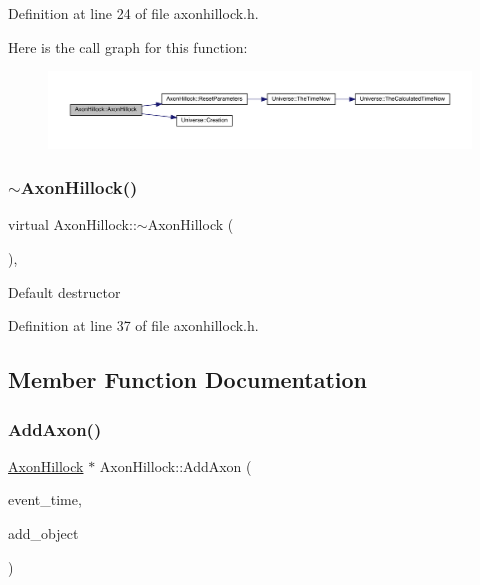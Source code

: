 Definition at line 24 of file axonhillock.\+h.

Here is the call graph for this function\+:\nopagebreak
\begin{figure}[H]
\begin{center}
\leavevmode
\includegraphics[width=350pt]{class_axon_hillock_a250945e24a51475369b6c7881c0d955b_cgraph}
\end{center}
\end{figure}
\mbox{\label{class_axon_hillock_ae86220026d7c87edc1c514521d66f992}} 
\subsubsection{\texorpdfstring{$\sim$\+Axon\+Hillock()}{~AxonHillock()}}
{\footnotesize\ttfamily virtual Axon\+Hillock\+::$\sim$\+Axon\+Hillock (\begin{DoxyParamCaption}{ }\end{DoxyParamCaption})\hspace{0.3cm}{\ttfamily [inline]}, {\ttfamily [virtual]}}

Default destructor 

Definition at line 37 of file axonhillock.\+h.



\subsection{Member Function Documentation}
\mbox{\label{class_axon_hillock_a02bfbaea9ea7a160933f8500c8b41d6a}} 
\subsubsection{\texorpdfstring{Add\+Axon()}{AddAxon()}}
{\footnotesize\ttfamily \mbox{\hyperlink{class_axon_hillock}{Axon\+Hillock}} $\ast$ Axon\+Hillock\+::\+Add\+Axon (\begin{DoxyParamCaption}\item[{std\+::chrono\+::time\+\_\+point$<$ \mbox{\hyperlink{universe_8h_a0ef8d951d1ca5ab3cfaf7ab4c7a6fd80}{Clock}} $>$}]{event\+\_\+time,  }\item[{\mbox{\hyperlink{class_axon_hillock}{Axon\+Hillock}} $\ast$}]{add\+\_\+object }\end{DoxyParamCaption})}



